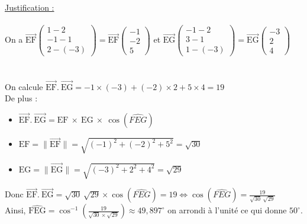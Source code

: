 \documentclass[a4paper, 12pt]{article}
\begin{document}
\noindent
\underline{Justification :}
\\ \\
On a $\overrightarrow{\text{EF}}\begin{pmatrix} 1-2 \\ -1-1 \\2-(-3)\end{pmatrix} = \overrightarrow{\text{EF}}\begin{pmatrix} -1 \\ -2 \\ 5 \end{pmatrix}$ 
et $\overrightarrow{\text{EG}}\begin{pmatrix} -1-2 \\ 3-1\\1-(-3)\end{pmatrix} = \overrightarrow{\text{EG}}\begin{pmatrix} -3 \\ 2 \\ 4 \end{pmatrix}$
\\ \\ \\
On calcule $\overrightarrow{\text{EF}} .\ \overrightarrow{\text{EG}} = -1 \times (-3) + (-2) \times 2 + 5 \times 4 = 19$
\\
De plus : \\
\begin{itemize}
    \item[\textbullet] $\overrightarrow{\text{EF}} .\ \overrightarrow{\text{EG}} = \text{EF}\ \times\ \text{EG}\ \times\ \cos{\left( \widehat{FEG} \right)}$ \\
    \item[\textbullet] $\text{EF} = \|\overrightarrow{\text{EF}}\| = \sqrt{(-1)^2 + (-2)^2 + 5^2} = \sqrt{30}$ \\ 
    \item[\textbullet] $\text{EG} = \| \overrightarrow{\text{EG}} \| = \sqrt{(-3)^2 + 2^2 + 4^2} = \sqrt{29}$ \\  
\end{itemize}
Donc $\overrightarrow{\text{EF}} .\ \overrightarrow{\text{EG}} = \sqrt{30}\ \sqrt{29} \times \cos{\left( \widehat{FEG} \right)} = 19 \iff \cos{\left( \widehat{FEG} \right)} = \frac{19}{\sqrt{30}\ \sqrt{29}}$
\\
Ainsi, $\widehat{\text{FEG}} = \cos^{-1}{ \left( \frac{19}{ \sqrt{30} \times \sqrt{29}} \right) } \approx 49,897^{\circ}$ on arrondi à l'unité ce qui donne $50^{\circ}$.
\end{document}
